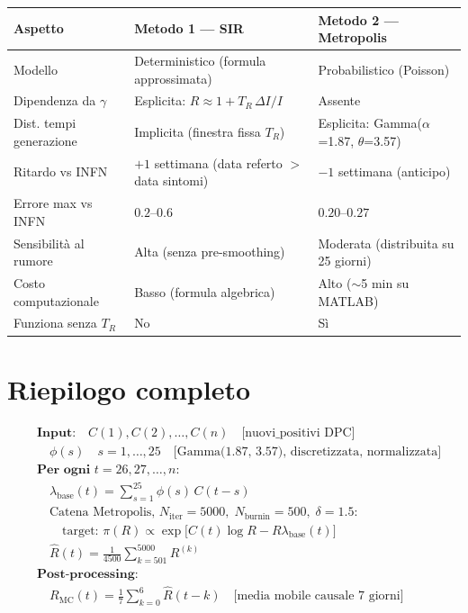 \documentclass[12pt,a4paper]{article}
\newcommand{\lbase}{\lambda_{\mathrm{base}}}
\begin{document}
\begin{center}
\renewcommand{\arraystretch}{1.6}
\begin{tabular}{p{4cm}p{5cm}p{5cm}}
\toprule
\textbf{Aspetto} & \textbf{Metodo 1 --- SIR} & \textbf{Metodo 2 --- Metropolis} \\
\midrule
Modello & Deterministico (formula approssimata) & Probabilistico (Poisson) \\
Dipendenza da $\gamma$ & Esplicita: $R \approx 1 + T_R\,\Delta I/I$ & Assente \\
Dist. tempi generazione & Implicita (finestra fissa $T_R$) & Esplicita: Gamma($\alpha$=1.87, $\theta$=3.57) \\
Ritardo vs INFN & $+1$ settimana (data referto $>$ data sintomi) & $-1$ settimana (anticipo) \\
Errore max vs INFN & $0.2$--$0.6$ & $0.20$--$0.27$ \\
Sensibilità al rumore & Alta (senza pre-smoothing) & Moderata (distribuita su 25 giorni) \\
Costo computazionale & Basso (formula algebrica) & Alto ($\sim$5 min su MATLAB) \\
Funziona senza $T_R$ & No & Sì \\
\bottomrule
\end{tabular}
\end{center}

\section{Riepilogo completo}

\begin{riepilogo}[title=Pipeline del Metodo 2]
\begin{align*}
&\textbf{Input:} \quad C(1), C(2), \ldots, C(n) \quad \text{[nuovi\_positivi DPC]} \\
&\quad \phi(s) \quad s=1,\ldots,25 \quad \text{[Gamma(1.87, 3.57), discretizzata, normalizzata]} \\[6pt]
&\textbf{Per ogni } t = 26, 27, \ldots, n\textbf{:} \\
&\quad \lbase(t) = \sum_{s=1}^{25} \phi(s)\, C(t-s) \\
&\quad \text{Catena Metropolis, } N_{\mathrm{iter}}=5000,\; N_{\mathrm{burnin}}=500,\; \delta=1.5\text{:} \\
&\qquad \text{target: } \pi(R) \propto \exp\!\bigl[C(t)\log R - R\lbase(t)\bigr] \\
&\quad \widehat{R}(t) = \frac{1}{4500}\sum_{k=501}^{5000} R^{(k)} \\[6pt]
&\textbf{Post-processing:} \\
&\quad R_{\mathrm{MC}}(t) = \frac{1}{7}\sum_{k=0}^{6} \widehat{R}(t-k) \quad \text{[media mobile causale 7 giorni]}
\end{align*}
\end{riepilogo}
\end{document}
